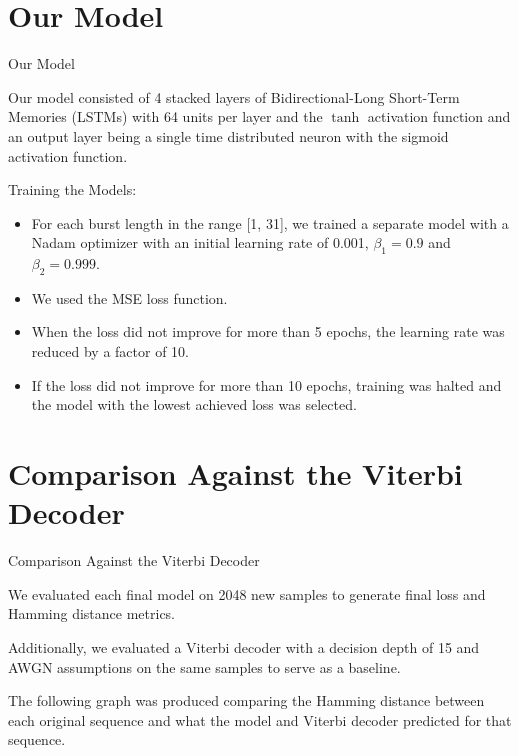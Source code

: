 \documentclass{beamer}
\newcommand{\<}				{\langle}
\renewcommand{\>}      		{\rangle}
\begin{document}
\section{Our Model} 

\begin{frame}{Our Model} 

Our model consisted of 4 stacked layers of Bidirectional-Long Short-Term Memories (LSTMs) with 64 units per layer and the $\tanh$ activation function and an output layer being a single time distributed neuron with the sigmoid activation function. 

\smallskip

Training the Models:

\begin{itemize}
\item For each burst length in the range [1, 31], we trained a separate model with a Nadam optimizer with an initial learning rate of 0.001, $\beta_1=0.9$ and $\beta_2=0.999$.

\item We used the MSE loss function.

\item When the loss did not improve for more than 5 epochs, the learning rate was reduced by a factor of 10.

\item If the loss did not improve for more than 10 epochs, training was halted and the model with the lowest achieved loss was selected. 

\end{itemize}

\end{frame}

\section{Comparison Against the Viterbi Decoder} 

\begin{frame}{Comparison Against the Viterbi Decoder}

We evaluated each final model on 2048 new samples to generate final loss and Hamming distance metrics. 

\medskip

Additionally, we evaluated a Viterbi decoder with a decision depth of 15 and AWGN assumptions on the same samples to serve as a baseline.

\medskip

The following graph was produced comparing the Hamming distance between each original sequence and what the model and Viterbi decoder predicted for that sequence.
\end{frame}
\end{document}
